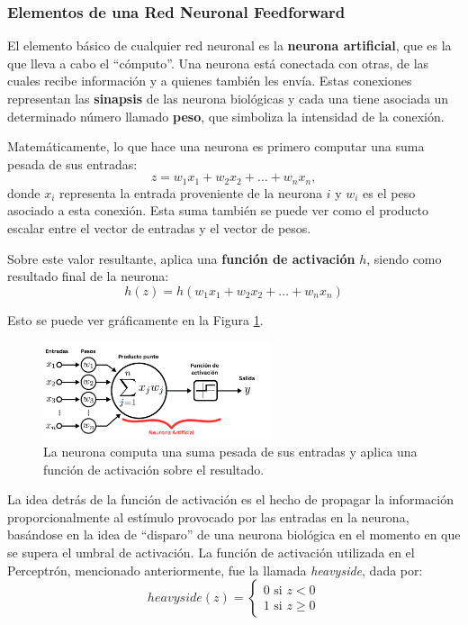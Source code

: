 \documentclass[../../main.tex]{subfiles}
\begin{document}
\subsubsection{Elementos de una Red Neuronal Feedforward}



El elemento básico de cualquier red neuronal es la \textbf{neurona artificial}, que es la que lleva a cabo el ``cómputo''. Una neurona está conectada con otras, de las cuales recibe información y a quienes también les envía. Estas conexiones representan las \textbf{sinapsis} de las neurona biológicas y cada una tiene asociada un determinado número llamado \textbf{peso}, que simboliza la intensidad de la conexión. 

Matemáticamente, lo que hace una neurona es primero computar una suma pesada de sus entradas:
\[z = w_1x_1 + w_2x_2 + \dots + w_nx_n,\]
donde \(x_i\) representa la entrada proveniente de la neurona \(i\) y \(w_i\) es el peso asociado a esta conexión. Esta suma también se puede ver como el producto escalar entre el vector de entradas y el vector de pesos.

Sobre este valor resultante, aplica una \textbf{función de activación} \(h\), siendo como resultado final de la neurona:
\[h(z) = h(w_1x_1 + w_2x_2 + \dots + w_nx_n)\]

Esto se puede ver gráficamente en la Figura \ref{fig:neuron}.

\begin{figure}[h!]
    \centering
    \includegraphics[width=0.6\textwidth]{figs/neurona.png}
    \caption{La neurona computa una suma pesada de sus entradas y aplica una función de activación sobre el resultado.}
    \label{fig:neuron}
\end{figure}

La idea detrás de la función de activación es el hecho de propagar la información proporcionalmente al estímulo provocado por las entradas en la neurona, basándose en la idea de ``disparo'' de una neurona biológica en el momento en que se supera el umbral de activación. La función de activación utilizada en el Perceptrón, mencionado anteriormente, fue la llamada \textit{heavyside}, dada por:
\[
    heavyside\left(z\right) =
        \begin{cases}  
            0\text{ si }z < 0 \\
            1\text{ si }z \geq 0
        \end{cases}
\] 
\end{document}
